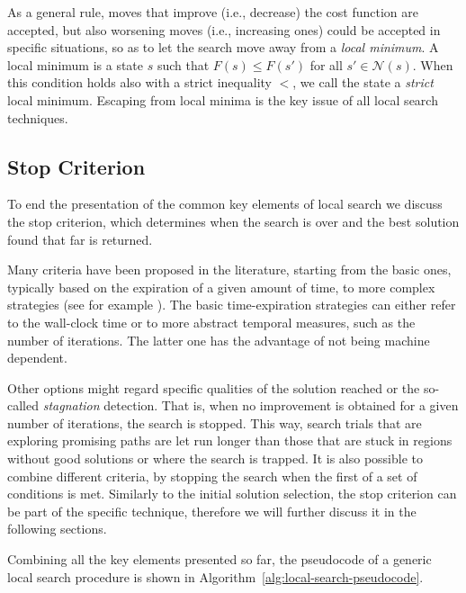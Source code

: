 As a general rule, moves that improve (i.e., decrease) the cost function are
accepted, but also worsening moves (i.e., increasing ones) could be accepted in specific
situations, so as to let the search move away from a \emph{local minimum}.
A local minimum is a state $s$ such that $F(s) \leq F(s')$ for all $s'
\in \mathcal{N}(s)$. When this condition holds also with a strict inequality $<$, 
we call the state a \emph{strict} local minimum. Escaping from local minima is the key issue of all local search techniques.

\subsection{Stop Criterion}\label{sec:stop-criteria}

To end the presentation of the common key elements of local search
we discuss the stop criterion, which determines when the search
is over and the best solution found that far is returned.

Many criteria have been proposed in the literature, starting from the
basic ones, typically based on the expiration of a given amount of time, 
to more complex strategies (see for example \cite[Sect.~3.2]{FrSt19}).
The basic time-expiration strategies can either refer to the wall-clock time or to more
abstract temporal measures, such as the number of iterations. The latter one has the 
advantage of not being machine dependent.

Other options might regard specific qualities of the solution reached
or the so-called \emph{stagnation} detection. That is, when no
improvement is obtained for a given number of iterations, the search is
stopped.  This way, search trials that are exploring promising paths
are let run longer than those that are stuck in regions without good
solutions or where the search is trapped.  It is also possible to
combine different criteria, by stopping the search when the first of a
set of conditions is met.  Similarly to the initial solution
selection, the stop criterion can be part of the specific technique,
therefore we will further discuss it in the following sections.
\vspace{\parskip}

Combining all the key elements presented so far, the pseudocode of a generic local search procedure is shown in
Algorithm~\ref{alg:local-search-pseudocode}.

